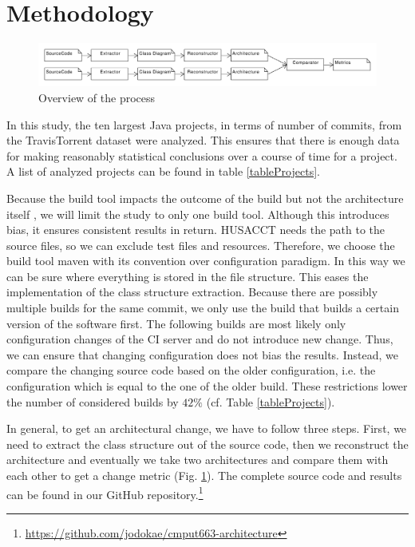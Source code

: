 \documentclass[conference]{IEEEtran}
\begin{document}
\section{Methodology}

\begin{figure}[!t]
	\centering
	\includegraphics[width=7in]{assets/overview.pdf}
	\caption{Overview of the process}
	\label{overview}
\end{figure}



In this study, the ten largest Java projects, in terms of number of commits, from the TravisTorrent dataset were analyzed. This ensures that there is enough data for making reasonably statistical conclusions over a course of time for a project. A list of analyzed projects can be found in table \ref{tableProjects}.

Because the build tool impacts the outcome of the build but not the architecture itself \cite{FailsCorr}, we will limit the study to only one build tool. Although this introduces bias, it ensures consistent results in return. HUSACCT needs the path to the source files, so we can exclude test files and resources. Therefore, we choose the build tool maven with its convention over configuration paradigm. In this way we can be sure where everything is stored in the file structure. This eases the implementation of the class structure extraction. 
Because there are possibly multiple builds for the same commit, we only use the build that builds a certain version of the software first. The following builds are most likely only configuration changes of the CI server and do not introduce new change. Thus, we can ensure that changing configuration does not bias the results. Instead, we compare the changing source code based on the older configuration, i.e. the configuration which is equal to the one of the older build. These restrictions lower the number of considered builds by $42\%$ (cf. Table \ref{tableProjects}). 

In general, to get an architectural change, we have to follow three steps. First, we need to extract the class structure out of the source code, then we reconstruct the architecture and eventually we take two architectures and compare them with each other to get a change metric (Fig. \ref{overview}). The complete source code and results can be found in our GitHub repository.\footnote{\url{https://github.com/jodokae/cmput663-architecture}}
\end{document}
